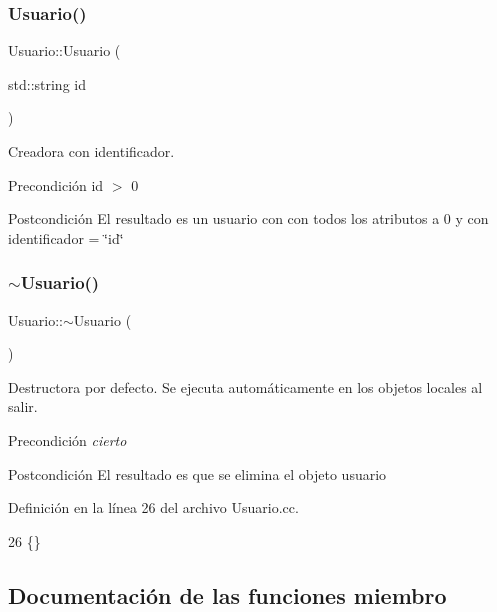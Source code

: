 \subsubsection{\texorpdfstring{Usuario()}{Usuario()}\hspace{0.1cm}{\footnotesize\ttfamily [2/2]}}
{\footnotesize\ttfamily Usuario\+::\+Usuario (\begin{DoxyParamCaption}\item[{std\+::string}]{id }\end{DoxyParamCaption})}



Creadora con identificador. 

\begin{DoxyPrecond}{Precondición}
id $>$ 0 
\end{DoxyPrecond}
\begin{DoxyPostcond}{Postcondición}
El resultado es un usuario con con todos los atributos a 0 y con identificador = \char`\"{}id\char`\"{} 
\end{DoxyPostcond}
\mbox{\label{class_usuario_ab4096b0b8300ecb47b10c555fb09c997}} 
\subsubsection{\texorpdfstring{$\sim$\+Usuario()}{~Usuario()}}
{\footnotesize\ttfamily Usuario\+::$\sim$\+Usuario (\begin{DoxyParamCaption}{ }\end{DoxyParamCaption})}



Destructora por defecto. Se ejecuta automáticamente en los objetos locales al salir. 

\begin{DoxyPrecond}{Precondición}
{\itshape cierto} 
\end{DoxyPrecond}
\begin{DoxyPostcond}{Postcondición}
El resultado es que se elimina el objeto usuario 
\end{DoxyPostcond}


Definición en la línea 26 del archivo Usuario.\+cc.


\begin{DoxyCode}
26 \{\}
\end{DoxyCode}


\subsection{Documentación de las funciones miembro}
\mbox{\label{class_usuario_a0b4c3ba568ee299aed56005ce6e6a72f}} 
